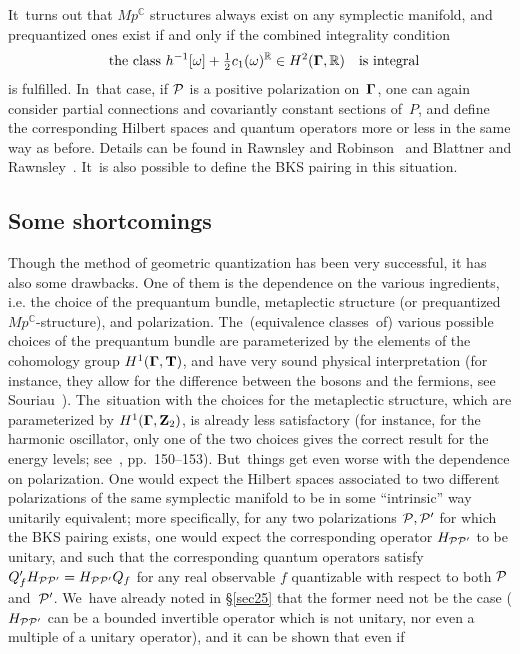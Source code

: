 \documentclass[12pt]{amsart}
\numberwithin{equation}{section}
\theoremstyle{remark}
\newcommand\TT{{\bold T}}
\newcommand\Omg{{\bigam}}   %
\newcommand\PP{{\Cal P}}
\newcommand\ZZ{\bold Z}
\newcommand\GG{{\PP'}}
\newcommand\RR{\mathbb R}
\newcommand{\CC}{\C}
\newcommand{\bigam}{\mbox{\boldmath $\Gamma$}}
\newcommand{\C}{\mathbb C}
\begin{document}
It~turns out that $Mp^\CC$ structures always exist on any symplectic manifold,
and prequantized ones exist if and only if the combined integrality condition
$$ \text{the class }h^{-1} [\omega] + \tfrac12 c_1(\omega)^\RR \in
H^2(\Omg,\RR) \text{ is integral}  $$
is fulfilled. In~that case, if $\PP$ is a positive polarization on~$\Omg$, one
can again consider partial connections and covariantly constant sections
of~$P$, and define the corresponding Hilbert spaces and quantum operators more
or less in the same way as before. Details can be found in Rawnsley and
Robinson~\cite{bib:RawnRob} and Blattner and Rawnsley~\cite{bib:BlattRaCo}.
It~is also possible to define the BKS pairing in this situation.



\subsection{Some shortcomings} \label{sec27}
Though the method of geometric quantization has been very successful, it has
also some drawbacks. One of them is the dependence on the various ingredients,
i.e. the choice of the prequantum bundle, metaplectic structure (or
prequantized $Mp^\CC$-structure), and polarization. The~(equivalence
classes~of) various possible choices of the prequantum bundle are parameterized
by the elements of the cohomology group $H^1(\Omg,\TT)$, and have very sound
physical interpretation (for instance, they allow for the difference between
the bosons and the fermions, see Souriau~\cite{bib:SouSD}). The~situation with
the choices for the metaplectic structure, which are parameterized by
$H^1(\Omg,\ZZ_2)$, is already less satisfactory (for instance, for the harmonic
oscillator, only one of the two choices gives the correct result for the energy
levels; see~\cite{bib:TuyCWI}, pp.~150--153). But~things get even worse
with the dependence on polarization. One would expect the Hilbert spaces
associated to two different polarizations of the same symplectic manifold to be
in some ``intrinsic'' way unitarily equivalent; more specifically, for any two
polarizations $\PP,\GG$ for which the BKS pairing exists, one would expect the
corresponding operator $H_{\PP\GG}$ to be unitary, and such that the
corresponding quantum operators satisfy $Q'_f H_{\PP\GG}= H_{\PP\GG} Q_f$ for
any real observable $f$ quantizable with respect to both $\PP$ and~$\GG$.
We~have already noted in \S\ref{sec25} that the former need not be the case
($H_{\PP\GG}$ can be a bounded invertible operator which is not unitary, nor
even a multiple of a unitary operator), and it can be shown that even if
\end{document}
